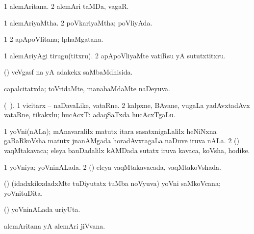 \bentry
{} 
\gl{\nA}
\expl{}
\bmng
\bnum
\num{1} alemAritana. 
\num{2} alemAri taMDa, vagaR. 
\enum
\emng
\eentry

\bentry
{} 
\gl{\gu}
\expl{}
\bmng
\bnum
\num{1} alemAriyaMtha. 
\num{2} poVkariyaMtha; poVliyAda. 
\enum
\emng
\eentry

\bentry
{} 
\gl{\nA}
\expl{}
\bmng
\bnum
\num{1}  
\num{2} apApoVlitana; lphaMgatana. 
\enum
\emng
\eentry

\bentry
{} 
\gl{\akirx}
\expl{}
\bmng
\bnum
\num{1} alemAriyAgi tirugu(titxru). 
\num{2} apApoVliyaMte vatiRsu yA sututxtitxru. 
\enum
\emng
\eentry

\bentry
{} 
\gl{\gu}
\expl{}
\bmng
 (\aMrashA) veVgasf  na yA adakekx saMbaMdhisida. 
\emng
\eentry

\bentry
{} 
\gl{\gu}
\expl{}
\bmng
 capalcitatxda; toVridaMte, manabaMdaMte naDeyuva. 
\emng
\eentry

\bentry
{} 
\gl{\nA}(\bava\ ). 
\bmng
\bnum
\num{1} vicitarx -- naDavaLike, vataRne. 
\num{2} kalpxne, BAvane, \mo vugaLa yadAvxtadAvx vataRne, tikakxlu; hucAcxT:  adaqSaTxda hucAcxTgaLu. 
\enum
\emng
\eentry

\bentry
{} 
\gl{\nA}
\bmng
\bnum
\num{1} yoVni(nALa); mAnavaralilx matutx itara sasatxnigaLalilx heNiNxna gaBaRkoVsha matutx jnanAMgada horadAvxragaLa naDuve iruva nALa. 
\num{2} (\savi) vaqMtakavaca; eleya bauDadalilx kAMDada sutatx iruva kavaca, koVsha, hodike. 
\enum
\emng
\eentry

\bentry
{} 
\gl{\gu}
\expl{}
\bmng
\bnum
\num{1} yoVniya; yoVninALada. 
\num{2} (\savi) eleya vaqMtakavacada, vaqMtakoVshada. 
\enum
\emng
\eentry

\bentry
{} 
\gl{\nA}
\expl{}
\bmng
 (\veYshA) (idadxkikxdadxMte tuDiyutatx tuMba noVyuva) yoVni saMkoVcana; yoVnituDita. 
\emng
\eentry

\bentry
{} 
\gl{\nA}
\expl{}
\bmng
 (\veYshA) yoVninALada uriyUta. 
\emng
\eentry

\bentry
{} 
\gl{\nA}
\expl{}
\bmng
 alemAritana yA alemAri jiVvana. 
\emng
\eentry

